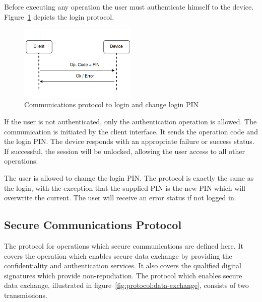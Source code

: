 Before executing any operation the user must authenticate himself to the device.
Figure~\ref{fig:protocol:login} depicts the login protocol.

\begin{figure}[h!]
	\centering
	\includegraphics[width=0.50\textwidth]{./Images/authentication.png}
	\caption{Communications protocol to login and change login PIN}
	\label{fig:protocol:login}
\end{figure}

If the user is not authenticated, only the authentication operation is allowed. The communication is initiated by the client interface. It sends the operation code and the login \ac{PIN}.
The device responds with an appropriate failure or success status. If successful, the session will be unlocked, allowing the user access to all other operations.

The user is allowed to change the login \ac{PIN}. The protocol is exactly the same as the login, with the exception that the supplied \ac{PIN} is the new \ac{PIN} which will overwrite the current. The user will receive an error status if not logged in.

\subsection{Secure Communications Protocol}\label{chap:implementation:protocol:comms}

The protocol for operations which secure communications are defined here. It covers the operation which enables secure data exchange by providing the confidentiality and authentication services. It also covers the qualified digital signatures which provide non-repudiation.
The protocol which enables secure data exchange, illustrated in figure~\ref{fig:protocol:data-exchange}, consists of two transmissions.

